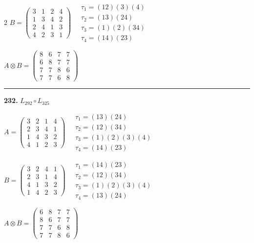 \begin{multicols}{2}
$B = \begin{pmatrix} 3 & 1 & 2 & 4 \\ 1 & 3 & 4 & 2 \\ 2 & 4 & 1 & 3 \\ 4 & 2 & 3 & 1 \end{pmatrix} \quad \begin{matrix} \tau_{1}=(1 2)(3)(4) \\ \tau_{2}=(1 3)(2 4) \\ \tau_{3}=(1)(2)(3 4) \\ \tau_{4}=(1 4)(2 3) \end{matrix}$

$A \otimes B = \begin{pmatrix} 8 & 6 & 7 & 7 \\ 6 & 8 & 7 & 7 \\ 7 & 7 & 8 & 6 \\ 7 & 7 & 6 & 8 \end{pmatrix}$

\vspace{0.3em}
\hrule
\vspace{0.3em}

\noindent\textbf{232.} $L_{292} \circ L_{325}$

$A = \begin{pmatrix} 3 & 2 & 1 & 4 \\ 2 & 3 & 4 & 1 \\ 1 & 4 & 3 & 2 \\ 4 & 1 & 2 & 3 \end{pmatrix} \quad \begin{matrix} \tau_{1}=(1 3)(2 4) \\ \tau_{2}=(1 2)(3 4) \\ \tau_{3}=(1)(2)(3)(4) \\ \tau_{4}=(1 4)(2 3) \end{matrix}$

$B = \begin{pmatrix} 3 & 2 & 4 & 1 \\ 2 & 3 & 1 & 4 \\ 4 & 1 & 3 & 2 \\ 1 & 4 & 2 & 3 \end{pmatrix} \quad \begin{matrix} \tau_{1}=(1 4)(2 3) \\ \tau_{2}=(1 2)(3 4) \\ \tau_{3}=(1)(2)(3)(4) \\ \tau_{4}=(1 3)(2 4) \end{matrix}$

$A \otimes B = \begin{pmatrix} 6 & 8 & 7 & 7 \\ 8 & 6 & 7 & 7 \\ 7 & 7 & 6 & 8 \\ 7 & 7 & 8 & 6 \end{pmatrix}$


\end{multicols}
